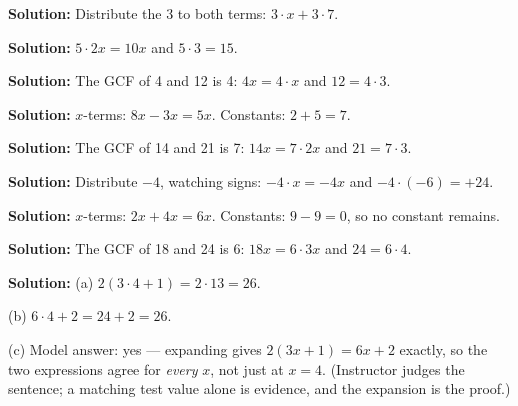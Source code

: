 \documentclass[12pt]{article}
\begin{document}



\textbf{Solution:} Distribute the 3 to both terms: $3 \cdot x + 3 \cdot 7$. 


\textbf{Solution:} $5 \cdot 2x = 10x$ and $5 \cdot 3 = 15$. 


\textbf{Solution:} The GCF of 4 and 12 is 4: $4x = 4 \cdot x$ and $12 = 4 \cdot 3$.


\textbf{Solution:} $x$-terms: $8x - 3x = 5x$. Constants: $2 + 5 = 7$. 


\textbf{Solution:} The GCF of 14 and 21 is 7: $14x = 7 \cdot 2x$ and $21 = 7 \cdot 3$.


\textbf{Solution:} Distribute $-4$, watching signs: $-4 \cdot x = -4x$ and
$-4 \cdot (-6) = +24$. 


\textbf{Solution:} $x$-terms: $2x + 4x = 6x$. Constants: $9 - 9 = 0$, so no constant
remains. 


\textbf{Solution:} The GCF of 18 and 24 is 6: $18x = 6 \cdot 3x$ and $24 = 6 \cdot 4$.


\textbf{Solution:} (a) $2(3 \cdot 4 + 1) = 2 \cdot 13 = 26$. 

(b) $6 \cdot 4 + 2 = 24 + 2 = 26$. 

(c) Model answer: yes --- expanding gives $2(3x + 1) = 6x + 2$ exactly, so the two
expressions agree for \emph{every} $x$, not just at $x = 4$. (Instructor judges the
sentence; a matching test value alone is evidence, and the expansion is the proof.)
\end{document}

